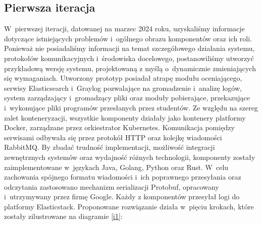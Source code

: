\subsection{Pierwsza iteracja}
W~pierwszej iteracji, datowanej na marzec 2024 roku, uzyskaliśmy informacje dotyczące istniejących problemów i~ogólnego obrazu komponentów oraz ich roli. Ponieważ nie posiadaliśmy informacji na temat szczegółowego działania systemu, protokołów komunikacyjnych i~środowiska docelowego, postanowiliśmy utworzyć przykładową wersję systemu, projektowaną z myślą o~dynamicznie zmieniających się wymaganiach. Utworzony prototyp posiadał atrapę modułu oceniającego, serwisy Elasticsearch i~Graylog pozwalające na gromadzenie i~analizę logów, system zarządzający i~gromadzący pliki oraz moduły pobierające, przekazujące i~wykonujące pliki programów przesłanych przez studentów. Ze względu na szereg zalet konteneryzacji, wszystkie komponenty działały jako kontenery platformy Docker, zarządzane przez orkiestrator Kubernetes. Komunikacja pomiędzy serwisami odbywała się przez protokół HTTP oraz kolejkę wiadomości RabbitMQ\cite{rabbit}. By zbadać trudność implementacji, możliwość integracji zewnętrznych systemów oraz wydajność różnych technologii, komponenty zostały zaimplementowane w~językach Java, Golang, Python oraz Rust. W~celu zachowania spójnego formatu wiadomości i~ich poprawnego przesyłania oraz odczytania zastosowano mechanizm serializacji Protobuf\cite{protobuf}, opracowany i~utrzymywany przez firmę Google. Każdy z komponentów przesyłał logi do platformy Elasticstack. Proponowane rozwiązanie działa w~pięciu krokach, które zostały zilustrowane na diagramie \ref{i1}:
